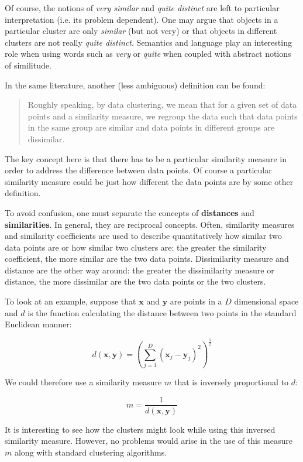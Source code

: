 \documentclass[a4paper,12pt,english]{report}
\begin{document}
Of course, the notions of \emph{very similar} and \emph{quite distinct} are left to particular interpretation (i.e. its problem dependent). One may argue that objects in a particular cluster are only \emph{similar} (but not very) or that objects in different clusters are not really \emph{quite distinct}. Semantics and language play an interesting role when using words such as \emph{very} or \emph{quite} when coupled with abstract notions of similitude.

In the same literature, another (less ambiguous) definition can be found:

\begin{quote}
Roughly speaking, by data clustering, we mean that for a given set of data points and a similarity measure, we regroup the data such that data points in the same group are similar and data points in different groups are dissimilar.
\end{quote}

The key concept here is that there has to be a particular similarity measure in order to address the difference between data points. Of course a particular similarity measure could be just how different the data points are by some other definition.

To avoid confusion, one must separate the concepts of \textbf{distances} and \textbf{similarities}. In general, they are reciprocal concepts. Often, similarity measures and similarity coefficients are used to describe quantitatively how similar two data points are or how similar two clusters are: the greater the similarity coefficient, the more similar are the two data points. Dissimilarity measure and distance are the other way around: the greater the dissimilarity measure or distance, the more dissimilar are the two data points or the two clusters\cite{clustering}.

To look at an example, suppose that $\mathbf{x}$ and $\mathbf{y}$ are points in a $D$ dimensional space and $d$ is the function calculating the distance between two points in the standard Euclidean manner:

$$d(\mathbf{x},\mathbf{y}) = \left(\sum_{j=1}^{D}(\mathbf{x}_{j} - \mathbf{y}_{j})^{2} \right)^\frac{1}{2}$$

We could therefore use a similarity measure $m$ that is inversely proportional to $d$:

$$m = \frac{1}{d(\mathbf{x},\mathbf{y})}$$

It is interesting to see how the clusters might look while using this inversed similarity measure. However, no problems would arise in the use of this measure $m$ along with standard clustering algorithms. 
\end{document}
